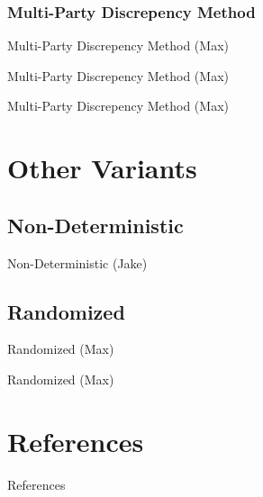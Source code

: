 \documentclass{beamer}
\begin{document}
\subsubsection{Multi-Party Discrepency Method}

\begin{frame}{Multi-Party Discrepency Method (Max)}

\end{frame}

\begin{frame}{Multi-Party Discrepency Method (Max)}

\end{frame}

\begin{frame}{Multi-Party Discrepency Method (Max)}

\end{frame}

\section{Other Variants}

\subsection{Non-Deterministic}

\begin{frame}{Non-Deterministic (Jake)}

\end{frame}

\subsection{Randomized}

\begin{frame}{Randomized (Max)}

\end{frame}

\begin{frame}{Randomized (Max)}

\end{frame}

\section{References}

\begin{frame}[t, allowframebreaks]{References}


\end{frame}
\end{document}
